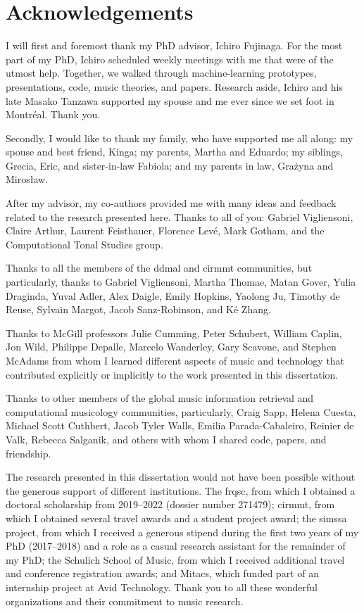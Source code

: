 \chapter*{Acknowledgements}
\label{chap:acknowledgements}

I will first and foremost thank my PhD advisor, Ichiro
Fujinaga. For the most part of my PhD, Ichiro scheduled
weekly meetings with me that were of the utmost help.
Together, we walked through machine-learning prototypes,
presentations, code, music theories, and papers. Research
aside, Ichiro and his late Masako Tanzawa supported my
spouse and me ever since we set foot in Montr\'eal. Thank
you.

Secondly, I would like to thank my family, who have
supported me all along: my spouse and best friend, Kinga; my
parents, Martha and Eduardo; my siblings, Grecia, Eric, and
sister-in-law Fabiola; and my parents in law, Gra\.zyna and
Miros\l{}aw.

After my advisor, my co-authors provided me with many ideas
and feedback related to the research presented here. Thanks
to all of you: Gabriel Vigliensoni, Claire Arthur, Laurent
Feisthauer, Florence Lev\'e, Mark Gotham, and the
Computational Tonal Studies group.

Thanks to all the members of the \gls{ddmal} and
\gls{cirmmt} communities, but particularly, thanks to
Gabriel Vigliensoni, Martha Thomae, Matan Gover, Yulia
Draginda, Yuval Adler, Alex Daigle, Emily Hopkins, Yaolong
Ju, Timothy de Reuse, Sylvain Margot, Jacob Sanz-Robinson,
and K\'e Zhang.

Thanks to McGill professors Julie Cumming, Peter Schubert,
William Caplin, Jon Wild, Philippe Depalle, Marcelo
Wanderley, Gary Scavone, and Stephen McAdams from whom I
learned different aspects of music and technology that
contributed explicitly or implicitly to the work presented
in this dissertation.

Thanks to other members of the global music information
retrieval and computational musicology communities,
particularly, Craig Sapp, Helena Cuesta, Michael Scott
Cuthbert, Jacob Tyler Walls, Emilia Parada-Cabaleiro,
Reinier de Valk, Rebecca Salganik, and others with whom I
shared code, papers, and friendship.

The research presented in this dissertation would not have
been possible without the generous support of different
institutions. The \gls{frqsc}, from which I obtained a
doctoral scholarship from 2019--2022 (dossier number
271479); \gls{cirmmt}, from which I obtained several travel
awards and a student project award; the \gls{simssa}
project, from which I received a generous stipend during the
first two years of my PhD (2017--2018) and a role as a
casual research assistant for the remainder of my PhD; the
Schulich School of Music, from which I received additional
travel and conference registration awards; and Mitacs, which
funded part of an internship project at Avid Technology.
Thank you to all these wonderful organizations and their
commitment to music research.

